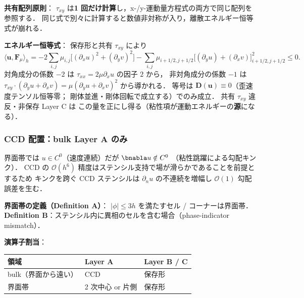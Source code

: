 \noindent\textbf{共有配列原則}：
$\tau_{xy}$ は\textbf{1 回だけ計算}し，x-/y-運動量方程式の両方で同じ配列を参照する．
同じ式で別々に計算すると数値非対称が入り，離散エネルギー恒等式が崩れる．

\noindent\textbf{エネルギー恒等式}：
保存形と共有 $\tau_{xy}$ により
\begin{equation}
  \langle\mathbf{u},\mathbf{F}_\mu\rangle_h
  = -2\sum_{i,j}\mu_{i,j}\bigl[(\partial_x u)^2+(\partial_y v)^2\bigr]
  - \sum_{i,j}\mu_{i+1/2,j+1/2}\bigl[(\partial_y u) + (\partial_x v)\bigr]^2_{i+1/2,j+1/2}
  \le 0.
  \label{eq:viscous_energy_identity}
\end{equation}
対角成分の係数 $-2$ は $\tau_{xx}=2\mu\partial_x u$ の因子 $2$ から，
非対角成分の係数 $-1$ は $\tau_{xy}\cdot(\partial_y u + \partial_x v)
= \mu(\partial_y u + \partial_x v)^2$ から導かれる．
等号は $\mathbf{D}(\mathbf{u})\equiv 0$（歪速度テンソル恒等零；
剛体並進・剛体回転で成立する）でのみ成立．
共有 $\tau_{xy}$ 違反・非保存 Layer C は
この量を正にし得る（粘性項が運動エネルギーの\textbf{源}になる）．

\subsubsection{CCD 配置：bulk Layer A のみ}
\label{sec:viscous_ccd_placement}

界面帯では $u\in C^0$（速度連続）だが $\bnabla u\notin C^0$
（粘性跳躍による勾配キンク）．
CCD の $\mathcal{O}(h^6)$ 精度はステンシル支持で場が滑らかであることを前提とするため
キンクを跨ぐ CCD ステンシルは $\partial_n u$ の不連続を増幅し
$\mathcal{O}(1)$ 勾配誤差を生む．

\noindent\textbf{界面帯の定義（Definition A）}：
$|\phi|\le 3h$ を満たすセル / コーナーは界面帯．
\textbf{Definition B}：ステンシル内に異相のセルを含む場合（phase-indicator mismatch）．

\noindent\textbf{演算子割当}：
\begin{center}
\begin{tabular}{@{}lll@{}}
\hline
領域 & Layer A & Layer B / C \\
\hline
bulk（界面から遠い）& CCD & 保存形 \\
界面帯 & 2 次中心 or 片側 & 保存形 \\
\hline
\end{tabular}
\end{center}

